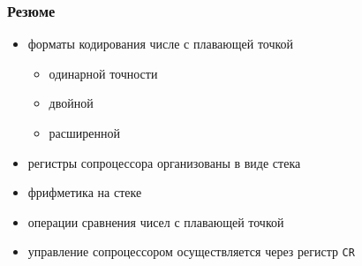 \documentclass[utf8, russian, aspectratio=1610]{beamer}
\begin{document}
\begin{frame}
    \frametitle{Резюме}

    \begin{itemize}
        \item форматы кодирования числе с плавающей точкой
        \begin{itemize}
            \item одинарной точности
            \item двойной
            \item расширенной
        \end{itemize}
        \item регистры сопроцессора организованы в виде стека
        \item фрифметика на стеке
        \item операции сравнения чисел с плавающей точкой
        \item управление сопроцессором осуществляется через регистр {\tt CR}
    \end{itemize}
\end{frame}
\end{document}

